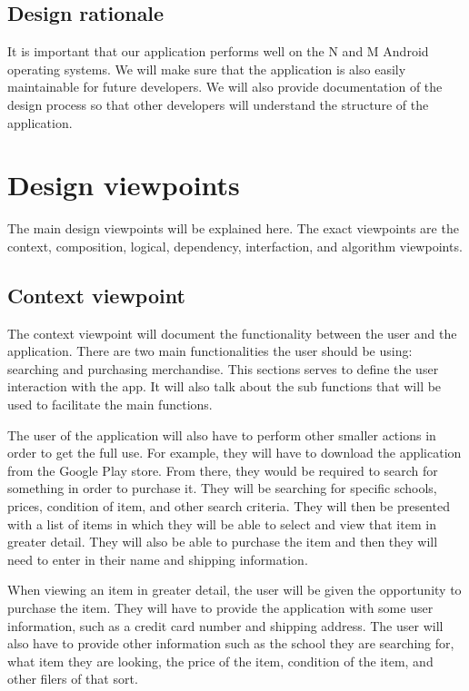 \documentclass[journal,compsoc, 10pt, draftclsnofoot, onecolumn]{IEEEtran}
\begin{document}
\subsection{Design rationale}
It is important that our application performs well on the N and M Android operating 
systems. We will make sure that the application is also easily maintainable 
for future developers. We will also provide documentation of the design process 
so that other developers will understand the structure of the application.


\section{Design viewpoints}
The main design viewpoints will be explained here. The exact viewpoints are the 
context, composition, logical, dependency, interfaction, and algorithm viewpoints.

\subsection{Context viewpoint}
The context viewpoint will document the functionality between the user and the 
application. There are two main functionalities the user should be using: 
searching and purchasing merchandise. This sections serves to define the user 
interaction with the app. It will also talk about the sub functions that will 
be used to facilitate the main functions. \newline

The user of the application will also have to perform other smaller actions in 
order to get the full use. For example, they will have to download the application 
from the Google Play store. From there, they would be required to search for 
something in order to purchase it. They will be searching for specific schools, 
prices, condition of item, and other search criteria. They will then be presented 
with a list of items in which they will be able to select and view that item in 
greater detail. They will also be able to purchase the item and then they will 
need to enter in their name and shipping information. \newline

When viewing an item in greater detail, the user will be given the opportunity 
to purchase the item. They will have to provide the application with some user 
information, such as a credit card number and shipping address. The user will 
also have to provide other information such as the school they are searching 
for, what item they are looking, the price of the item, condition of the item, 
and other filers of that sort.
\end{document}
